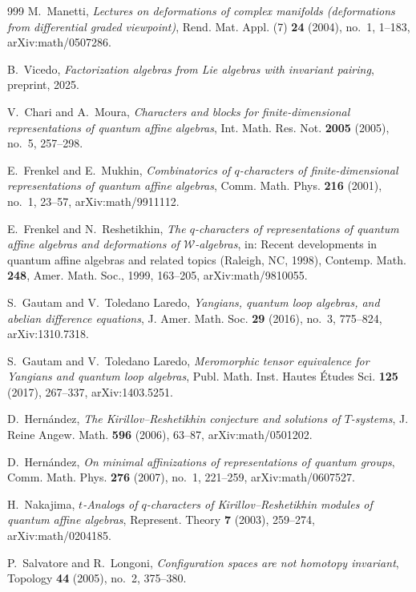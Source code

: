 \begin{thebibliography}{999}
M.~Manetti, \emph{Lectures on deformations of complex manifolds (deformations from differential graded viewpoint)}, Rend. Mat. Appl. (7) \textbf{24} (2004), no.~1, 1--183, arXiv:math/0507286.

B.~Vicedo, \emph{Factorization algebras from Lie algebras with invariant pairing}, preprint, 2025.

V.~Chari and A.~Moura, \emph{Characters and blocks for finite-dimensional representations of quantum affine algebras}, Int. Math. Res. Not. \textbf{2005} (2005), no.~5, 257--298.

E.~Frenkel and E.~Mukhin, \emph{Combinatorics of $q$-characters of finite-dimensional representations of quantum affine algebras}, Comm. Math. Phys. \textbf{216} (2001), no.~1, 23--57, arXiv:math/9911112.

E.~Frenkel and N.~Reshetikhin, \emph{The $q$-characters of representations of quantum affine algebras and deformations of $\mathcal{W}$-algebras}, in: Recent developments in quantum affine algebras and related topics (Raleigh, NC, 1998), Contemp. Math. \textbf{248}, Amer. Math. Soc., 1999, 163--205, arXiv:math/9810055.

S.~Gautam and V.~Toledano Laredo, \emph{Yangians, quantum loop algebras, and abelian difference equations}, J. Amer. Math. Soc. \textbf{29} (2016), no.~3, 775--824, arXiv:1310.7318.

S.~Gautam and V.~Toledano Laredo, \emph{Meromorphic tensor equivalence for Yangians and quantum loop algebras}, Publ. Math. Inst. Hautes \'Etudes Sci. \textbf{125} (2017), 267--337, arXiv:1403.5251.

D.~Hern\'andez, \emph{The Kirillov--Reshetikhin conjecture and solutions of $T$-systems}, J. Reine Angew. Math. \textbf{596} (2006), 63--87, arXiv:math/0501202.

D.~Hern\'andez, \emph{On minimal affinizations of representations of quantum groups}, Comm. Math. Phys. \textbf{276} (2007), no.~1, 221--259, arXiv:math/0607527.

H.~Nakajima, \emph{$t$-Analogs of $q$-characters of Kirillov--Reshetikhin modules of quantum affine algebras}, Represent. Theory \textbf{7} (2003), 259--274, arXiv:math/0204185.

P.~Salvatore and R.~Longoni, \emph{Configuration spaces are not homotopy invariant}, Topology \textbf{44} (2005), no.~2, 375--380.


\end{thebibliography}
